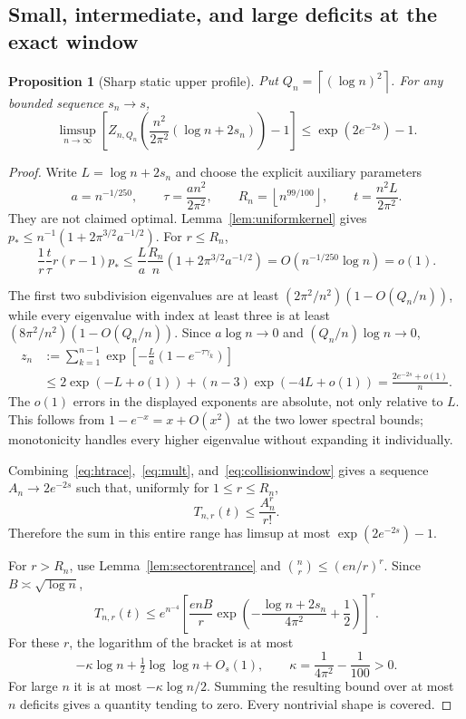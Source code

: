 \documentclass[11pt]{article}
\newtheorem{proposition}[theorem]{Proposition}
\theoremstyle{remark}
\newcommand{\floor}[1]{\left\lfloor #1\right\rfloor}
\newcommand{\ceil}[1]{\left\lceil #1\right\rceil}
\begin{document}
\subsection{Small, intermediate, and large deficits at the exact window}
\begin{proposition}[Sharp static upper profile]\label{prop:staticprofile}
Put $Q_n=\ceil{(\log n)^2}$. For any bounded sequence $s_n\to s$,
\[
 \limsup_{n\to\infty}\left[
 Z_{n,Q_n}\!\left(\frac{n^2}{2\pi^2}(\log n+2s_n)\right)-1\right]
 \leq\exp(2e^{-2s})-1.
\]
\end{proposition}
\begin{proof}
Write $L=\log n+2s_n$ and choose the explicit auxiliary parameters
\[
 a=n^{-1/250},\qquad \tau=\frac{a n^2}{2\pi^2},\qquad
 R_n=\floor{n^{99/100}},\qquad t=\frac{n^2L}{2\pi^2}.
\]
They are not claimed optimal. Lemma~\ref{lem:uniformkernel} gives
$p_*\leq n^{-1}(1+2\pi^{3/2}a^{-1/2})$. For $r\leq R_n$,
\begin{equation}\label{eq:collisionwindow}
 \frac1r\frac t\tau r(r-1)p_*
 \leq \frac L a\frac{R_n}{n}(1+2\pi^{3/2}a^{-1/2})
 =O(n^{-1/250}\log n)=o(1).
\end{equation}

The first two subdivision eigenvalues are at least
$(2\pi^2/n^2)(1-O(Q_n/n))$, while every eigenvalue with index at least three is at least
$(8\pi^2/n^2)(1-O(Q_n/n))$. Since $a\log n\to0$ and $(Q_n/n)\log n\to0$,
\begin{align*}
 z_n&:=\sum_{k=1}^{n-1}\exp\!\left[-\frac L a(1-e^{-\tau\gamma_k})\right]\\
 &\leq 2\exp(-L+o(1))+(n-3)\exp(-4L+o(1))
 =\frac{2e^{-2s}+o(1)}n.
\end{align*}
The $o(1)$ errors in the displayed exponents are absolute, not only relative to $L$. This follows from $1-e^{-x}=x+O(x^2)$ at the two lower spectral bounds; monotonicity handles every higher eigenvalue without expanding it individually.

Combining~\eqref{eq:htrace},~\eqref{eq:mult}, and~\eqref{eq:collisionwindow} gives a sequence $A_n\to2e^{-2s}$ such that, uniformly for $1\leq r\leq R_n$,
\[
 T_{n,r}(t)\leq\frac{A_n^r}{r!}.
\]
Therefore the sum in this entire range has limsup at most $\exp(2e^{-2s})-1$.

For $r>R_n$, use Lemma~\ref{lem:sectorentrance} and
$\binom nr\leq(en/r)^r$. Since $B\asymp\sqrt{\log n}$,
\[
 T_{n,r}(t)
 \leq e^{n^{-4}}
 \left[\frac{enB}{r}\exp\!\left(-\frac{\log n+2s_n}{4\pi^2}+\frac12\right)\right]^r.
\]
For these $r$, the logarithm of the bracket is at most
\[
 -\kappa\log n+\tfrac12\log\log n+O_s(1),\qquad
 \kappa=\frac1{4\pi^2}-\frac1{100}>0.
\]
For large $n$ it is at most $-\kappa\log n/2$. Summing the resulting bound over at most $n$ deficits gives a quantity tending to zero. Every nontrivial shape is covered.
\end{proof}
\end{document}
